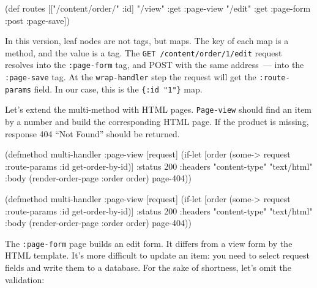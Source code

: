 \else

\begin{clojure}
(def routes
  [["/content/order/" :id] {"/view" {:get  :page-view}
                            "/edit" {:get  :page-form
                                     :post :page-save}}])
\end{clojure}

\fi

In this version, leaf nodes are not tags, but maps. The key of each map is a method, and the value is a tag. The \verb|GET /content/order/1/edit| request resolves into
the \verb|:page-form| tag, and POST with the same address~--- into the \verb|:page-save| tag.  At the \verb|wrap-handler| step the request will get the \verb|:route-params| field. In our case, this is the \verb|{:id "1"}| map.


Let's extend the multi-method with HTML pages. \verb|Page-view| should find an item by a number and build the corresponding HTML page. If the product is missing, response 404 ``Not Found'' should be returned.

\ifx\DEVICETYPE\MOBILE

\begin{clojure}
(defmethod multi-handler :page-view
  [request]
  (if-let [order (some->
                   request
                   :route-params
                   :id
                   get-order-by-id)]
    {:status 200
     :headers {"content-type"
               "text/html"}
     :body (render-order-page
             {:order order})}
    page-404))
\end{clojure}

\else

\begin{clojure}
(defmethod multi-handler :page-view
  [request]
  (if-let [order (some-> request
                         :route-params
                         :id
                         get-order-by-id)]
    {:status 200
     :headers {"content-type" "text/html"}
     :body (render-order-page {:order order})}
    page-404))
\end{clojure}

\fi

The \verb|:page-form| page builds an edit form. It differs from a view form by the HTML template. It's more difficult to update an item: you need to select request fields and write them to a database. For the sake of shortness, let's omit the validation:

\ifx\DEVICETYPE\MOBILE

